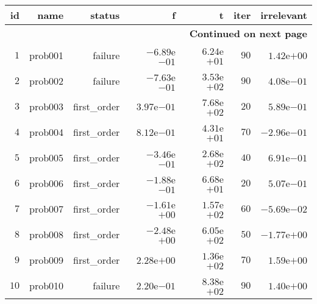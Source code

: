 \documentclass[varwidth=20cm,crop=true]{standalone}
\begin{document}
\begin{longtable}{rrrrrrr}
  \hline
  id & name & status & f & t & iter & irrelevant \\\hline
  \endhead
  \hline
  \multicolumn{7}{r}{{\bfseries Continued on next page}}\\
  \hline
  \endfoot
  \endlastfoot
  \(     1\) & prob001 & failure & \(-6.89\)e\(-01\) & \( 6.24\)e\(+01\) & \(    90\) & \( 1.42\)e\(+00\) \\
  \(     2\) & prob002 & failure & \(-7.63\)e\(-01\) & \( 3.53\)e\(+02\) & \(    90\) & \( 4.08\)e\(-01\) \\
  \(     3\) & prob003 & first\_order & \( 3.97\)e\(-01\) & \( 7.68\)e\(+02\) & \(    20\) & \( 5.89\)e\(-01\) \\
  \(     4\) & prob004 & first\_order & \( 8.12\)e\(-01\) & \( 4.31\)e\(+01\) & \(    70\) & \(-2.96\)e\(-01\) \\
  \(     5\) & prob005 & first\_order & \(-3.46\)e\(-01\) & \( 2.68\)e\(+02\) & \(    40\) & \( 6.91\)e\(-01\) \\
  \(     6\) & prob006 & first\_order & \(-1.88\)e\(-01\) & \( 6.68\)e\(+01\) & \(    20\) & \( 5.07\)e\(-01\) \\
  \(     7\) & prob007 & first\_order & \(-1.61\)e\(+00\) & \( 1.57\)e\(+02\) & \(    60\) & \(-5.69\)e\(-02\) \\
  \(     8\) & prob008 & first\_order & \(-2.48\)e\(+00\) & \( 6.05\)e\(+02\) & \(    50\) & \(-1.77\)e\(+00\) \\
  \(     9\) & prob009 & first\_order & \( 2.28\)e\(+00\) & \( 1.36\)e\(+02\) & \(    70\) & \( 1.59\)e\(+00\) \\
  \(    10\) & prob010 & failure & \( 2.20\)e\(-01\) & \( 8.38\)e\(+02\) & \(    90\) & \( 1.40\)e\(+00\) \\\hline
\end{longtable}
\end{document}

